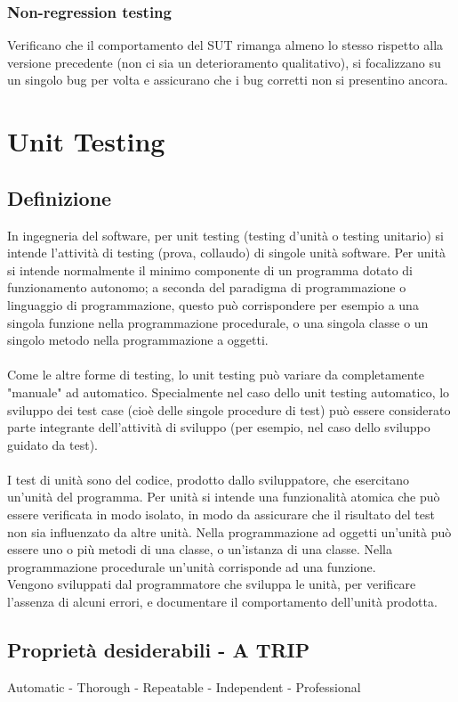 \documentclass[10pt, a4paper]{article}
\begin{document}
\subsubsection*{Non-regression testing}
Verificano che il comportamento del SUT rimanga almeno lo stesso rispetto alla versione precedente (non ci sia un deterioramento qualitativo), si focalizzano su un singolo bug per volta e assicurano che i bug corretti non si presentino ancora.


\section{Unit Testing}
\subsection{Definizione}
In ingegneria del software, per unit testing (testing d'unità o testing unitario) si intende
l'attività di testing (prova, collaudo) di singole unità software. Per unità si intende
normalmente il minimo componente di un programma dotato di funzionamento
autonomo; a seconda del paradigma di programmazione o linguaggio di programmazione,
questo può corrispondere per esempio a una singola funzione nella programmazione
procedurale, o una singola classe o un singolo metodo nella programmazione a oggetti.\\\\
Come le altre forme di testing, lo unit testing può variare da completamente "manuale" ad
automatico. Specialmente nel caso dello unit testing automatico, lo sviluppo dei test case
(cioè delle singole procedure di test) può essere considerato parte integrante dell'attività
di sviluppo (per esempio, nel caso dello sviluppo guidato da test).\\\\
I test di unità sono del codice, prodotto dallo sviluppatore, che esercitano un’unità del
programma.
Per unità si intende una funzionalità atomica che può essere verificata in modo isolato,
in modo da assicurare che il risultato del test non sia influenzato da altre unità.
Nella programmazione ad oggetti un’unità può essere uno o più metodi di una classe, o
un’istanza di una classe. Nella programmazione procedurale un’unità corrisponde ad una
funzione.\\
Vengono sviluppati dal programmatore che sviluppa le unità, per verificare
l’assenza di alcuni errori, e documentare il comportamento dell’unità prodotta.

\subsection{Proprietà desiderabili - A TRIP}
Automatic - Thorough - Repeatable - Independent - Professional
\end{document}
